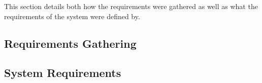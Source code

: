 This section details both how the requirements were gathered as well as what the requirements of the system were defined by.

\subsection{Requirements Gathering}
\label{gathering}


\subsection{System Requirements}
\label{system}

